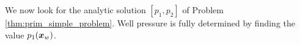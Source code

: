 We now look for the analytic solution $[p_1, p_2]$ of Problem \ref{thm:prim_simple_problem}.
Well pressure is fully determined by finding the value $p_1(\mathbf{\boldsymbol{x}}_w)$.
%
% 
%
